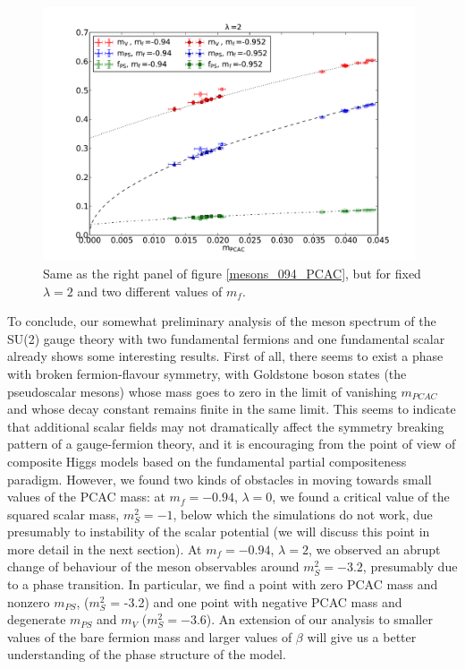 \begin{figure}[thb] 
\begin{center}
 \includegraphics[width=11cm,clip]{pics/mesons_l2_PCAC_fit}
  \end{center}
  \caption{Same as the right panel of figure \ref{mesons_094_PCAC}, but for fixed $\lambda = 2$ and two different values of $m_f$.}
  \label{mesons_l2_PCAC}
\end{figure}

To conclude, our somewhat preliminary analysis of the meson spectrum of the SU(2) gauge theory with two fundamental fermions and one fundamental scalar already shows some interesting results. First of all, there seems to exist a phase with broken fermion-flavour symmetry, with Goldstone boson states (the pseudoscalar mesons) whose mass goes to zero in the limit of vanishing $m_{PCAC}$ and whose decay constant remains finite in the same limit. This seems to indicate that additional scalar fields may not dramatically affect the symmetry breaking pattern of a gauge-fermion theory, and it is encouraging from the point of view of composite Higgs models based on the fundamental partial compositeness paradigm. However, we found two kinds of obstacles in moving towards small values of the PCAC mass: at $m_f = -0.94$, $\lambda = 0$, we found a critical value of the squared scalar mass, $m_S^2 = -1$, below which the simulations do not work, due presumably to instability of the scalar potential (we will discuss this point in more detail in the next section). At $m_f = -0.94$, $\lambda = 2$, we observed an abrupt change of behaviour of the meson observables around $m_S^2 = -3.2$, presumably due to a phase transition. In particular, we find a point with zero PCAC mass and nonzero $m_{PS}$, ($m_S^2$ = -3.2) and one point with negative PCAC mass and degenerate $m_{PS}$ and $m_V$ ($m_S^2 = -3.6$). An extension of our analysis to smaller values of the bare fermion mass and larger values of $\beta$ will give us a better understanding of the phase structure of the model. 


